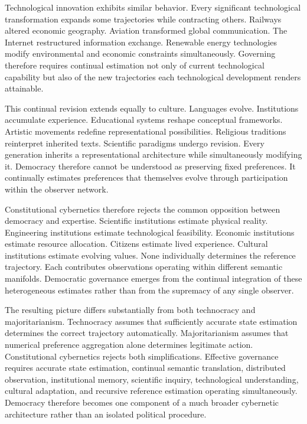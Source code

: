 \documentclass[12pt,a4paper]{article}
\begin{document}
Technological innovation exhibits similar behavior. Every significant technological transformation expands some trajectories while contracting others. Railways altered economic geography. Aviation transformed global communication. The Internet restructured information exchange. Renewable energy technologies modify environmental and economic constraints simultaneously. Governing therefore requires continual estimation not only of current technological capability but also of the new trajectories each technological development renders attainable.

This continual revision extends equally to culture. Languages evolve. Institutions accumulate experience. Educational systems reshape conceptual frameworks. Artistic movements redefine representational possibilities. Religious traditions reinterpret inherited texts. Scientific paradigms undergo revision. Every generation inherits a representational architecture while simultaneously modifying it. Democracy therefore cannot be understood as preserving fixed preferences. It continually estimates preferences that themselves evolve through participation within the observer network.

Constitutional cybernetics therefore rejects the common opposition between democracy and expertise. Scientific institutions estimate physical reality. Engineering institutions estimate technological feasibility. Economic institutions estimate resource allocation. Citizens estimate lived experience. Cultural institutions estimate evolving values. None individually determines the reference trajectory. Each contributes observations operating within different semantic manifolds. Democratic governance emerges from the continual integration of these heterogeneous estimates rather than from the supremacy of any single observer.

The resulting picture differs substantially from both technocracy and majoritarianism. Technocracy assumes that sufficiently accurate state estimation determines the correct trajectory automatically. Majoritarianism assumes that numerical preference aggregation alone determines legitimate action. Constitutional cybernetics rejects both simplifications. Effective governance requires accurate state estimation, continual semantic translation, distributed observation, institutional memory, scientific inquiry, technological understanding, cultural adaptation, and recursive reference estimation operating simultaneously. Democracy therefore becomes one component of a much broader cybernetic architecture rather than an isolated political procedure.
\end{document}

